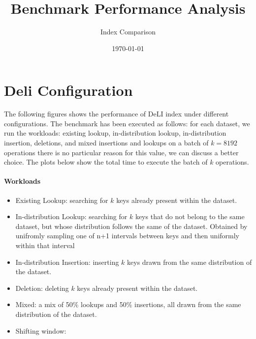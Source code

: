 \documentclass{article}
\begin{document}
\title{Benchmark Performance Analysis}
\author{Index Comparison}
\date{\today}
\maketitle

\newcommand{\note}[1]{{\color{red}#1}}

\section{Deli Configuration}\label{sec:deliconfig}


The following figures shows the performance of DeLI index under different configurations. The benchmark has been executed as follows: for each dataset, we run the workloads: existing lookup, in-distribution lookup, in-distribution insertion, deletions, and mixed insertions and lookups on a batch of $k = 8192$ operations \note{there is no particular reason for this value, we can discuss a better choice}. The plots below show the total time to execute the batch of $k$ operations.
\paragraph*{Workloads}
\begin{itemize}
  \item Existing Lookup: searching for $k$ keys already present within the dataset.
  \item In-distribution Lookup: searching for $k$ keys that do not belong to the same dataset, but whose distribution follows the same of the dataset. Obtained by unifromly sampling one of n+1 intervals between keys and then uniformly within that interval
  \item In-distribution Insertion: inserting $k$ keys drawn from the same distribution of the dataset.
  \item Deletion: deleting $k$ keys already present within the dataset.
  \item Mixed: a mix of 50\% lookups and 50\% insertions, all drawn from the same distribution of the dataset.
  \item Shifting window:
\end{itemize}
\end{document}
